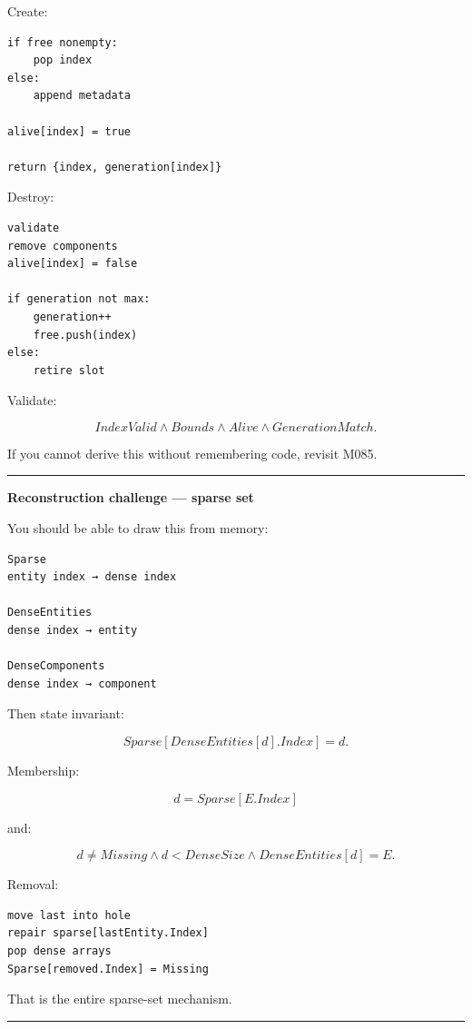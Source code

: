 Create:

\begin{verbatim}
if free nonempty:
    pop index
else:
    append metadata

alive[index] = true

return {index, generation[index]}
\end{verbatim}

Destroy:

\begin{verbatim}
validate
remove components
alive[index] = false

if generation not max:
    generation++
    free.push(index)
else:
    retire slot
\end{verbatim}

Validate:

\[
IndexValid
\land
Bounds
\land
Alive
\land
GenerationMatch.
\]

If you cannot derive this without remembering code, revisit M085.

\begin{center}\rule{0.5\linewidth}{0.5pt}\end{center}

\textbf{Reconstruction challenge --- sparse set}

You should be able to draw this from memory:

\begin{verbatim}
Sparse
entity index → dense index

DenseEntities
dense index → entity

DenseComponents
dense index → component
\end{verbatim}

Then state invariant:

\[
Sparse[DenseEntities[d].Index]=d.
\]

Membership:

\[
d=Sparse[E.Index]
\]

and:

\[
d\neq Missing
\land
d<DenseSize
\land
DenseEntities[d]=E.
\]

Removal:

\begin{verbatim}
move last into hole
repair sparse[lastEntity.Index]
pop dense arrays
Sparse[removed.Index] = Missing
\end{verbatim}

That is the entire sparse-set mechanism.

\begin{center}\rule{0.5\linewidth}{0.5pt}\end{center}

